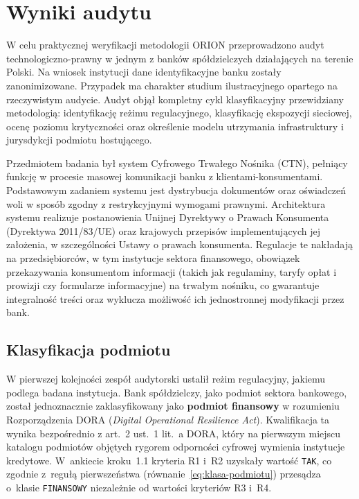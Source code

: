 \section{Wyniki audytu}

W celu praktycznej weryfikacji metodologii ORION przeprowadzono audyt technologiczno-prawny w jednym z banków spółdzielczych działających na terenie Polski. Na wniosek instytucji dane identyfikacyjne banku zostały zanonimizowane. Przypadek ma charakter studium ilustracyjnego opartego na rzeczywistym audycie. Audyt objął kompletny cykl klasyfikacyjny przewidziany metodologią: identyfikację reżimu regulacyjnego, klasyfikację ekspozycji sieciowej, ocenę poziomu krytyczności oraz określenie modelu utrzymania infrastruktury i jurysdykcji podmiotu hostującego.

Przedmiotem badania był system Cyfrowego Trwałego Nośnika (CTN), pełniący funkcję w procesie masowej komunikacji banku z klientami-konsumentami. Podstawowym zadaniem systemu jest dystrybucja dokumentów oraz oświadczeń woli w sposób zgodny z restrykcyjnymi wymogami prawnymi. Architektura systemu realizuje postanowienia Unijnej Dyrektywy o Prawach Konsumenta (Dyrektywa 2011/83/UE) oraz krajowych przepisów implementujących jej założenia, w szczególności Ustawy o prawach konsumenta. Regulacje te nakładają na przedsiębiorców, w tym instytucje sektora finansowego, obowiązek przekazywania konsumentom informacji (takich jak regulaminy, taryfy opłat i prowizji czy formularze informacyjne) na trwałym nośniku, co gwarantuje integralność treści oraz wyklucza możliwość ich jednostronnej modyfikacji przez bank.

\subsection{Klasyfikacja podmiotu}

W pierwszej kolejności zespół audytorski ustalił reżim regulacyjny, jakiemu podlega badana instytucja. Bank spółdzielczy, jako podmiot sektora bankowego, został jednoznacznie zaklasyfikowany jako \textbf{podmiot finansowy} w rozumieniu Rozporządzenia DORA (\textit{Digital Operational Resilience Act}). Kwalifikacja ta wynika bezpośrednio z art.~2 ust.~1 lit.~a DORA, który na pierwszym miejscu katalogu podmiotów objętych rygorem odporności cyfrowej wymienia instytucje kredytowe. W~ankiecie kroku~1.1 kryteria R1 i~R2 uzyskały wartość \texttt{TAK}, co zgodnie z~regułą pierwszeństwa (równanie~\eqref{eq:klasa-podmiotu}) przesądza o~klasie \texttt{FINANSOWY} niezależnie od wartości kryteriów R3 i~R4.

